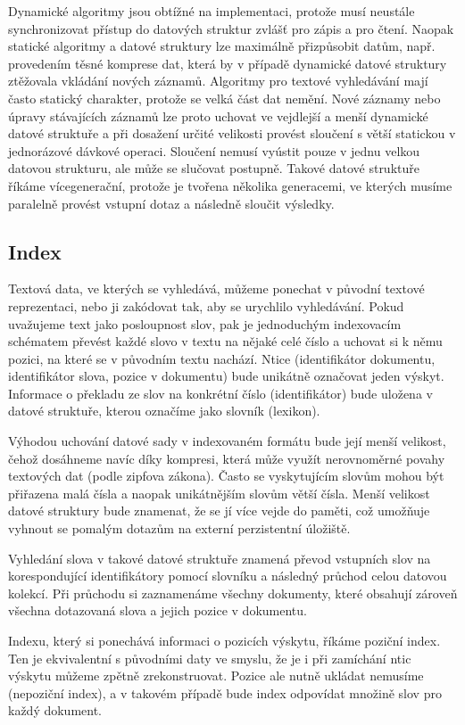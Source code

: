 \documentclass[11pt,letterpaper,oneside,openright]{book}
\begin{document}
Dynamické algoritmy jsou obtížné na implementaci, protože musí neustále
synchronizovat přístup do datových struktur zvlášť pro zápis a pro čtení.
Naopak statické algoritmy a datové struktury lze maximálně přizpůsobit datům,
např. provedením těsné komprese dat, která by v případě dynamické datové
struktury ztěžovala vkládání nových záznamů. Algoritmy pro textové vyhledávání
mají často statický charakter, protože se velká část dat nemění. Nové záznamy
nebo úpravy stávajících záznamů lze proto uchovat ve vejdlejší a menší
dynamické datové struktuře a při dosažení určité velikosti provést sloučení s
větší statickou v jednorázové dávkové operaci. Sloučení nemusí vyústit pouze v
jednu velkou datovou strukturu, ale může se slučovat postupně. Takové datové
struktuře říkáme vícegenerační, protože je tvořena několika generacemi, ve
kterých musíme paralelně provést vstupní dotaz a následně sloučit výsledky.

\subsection{Index}
Textová data, ve kterých se vyhledává, můžeme ponechat v původní textové
reprezentaci, nebo ji zakódovat tak, aby se urychlilo vyhledávání. Pokud
uvažujeme text jako posloupnost slov, pak je jednoduchým indexovacím schématem
převést každé slovo v textu na nějaké celé číslo a uchovat si k němu pozici, na
které se v původním textu nachází. Ntice (identifikátor dokumentu,
identifikátor slova, pozice v dokumentu) bude unikátně označovat jeden výskyt.
Informace o překladu ze slov na konkrétní číslo (identifikátor) bude uložena v
datové struktuře, kterou označíme jako slovník (lexikon).

Výhodou uchování datové sady v indexovaném formátu bude její menší velikost,
čehož dosáhneme navíc díky kompresi, která může využít nerovnoměrné povahy
textových dat (podle zipfova zákona). Často se vyskytujícím slovům mohou být
přiřazena malá čísla a naopak unikátnějším slovům větší čísla. Menší velikost
datové struktury bude znamenat, že se jí více vejde do paměti, což umožňuje
vyhnout se pomalým dotazům na externí perzistentní úložiště.

Vyhledání slova v takové datové struktuře znamená převod vstupních slov na
korespondující identifikátory pomocí slovníku a následný průchod celou datovou
kolekcí. Při průchodu si zaznamenáme všechny dokumenty, které obsahují zároveň
všechna dotazovaná slova a jejich pozice v dokumentu.

Indexu, který si ponechává informaci o pozicích výskytu, říkáme poziční index.
Ten je ekvivalentní s původními daty ve smyslu, že je i při zamíchání ntic
výskytu můžeme zpětně zrekonstruovat. Pozice ale nutně ukládat nemusíme
(nepoziční index), a v takovém případě bude index odpovídat množině slov pro
každý dokument.
\end{document}
